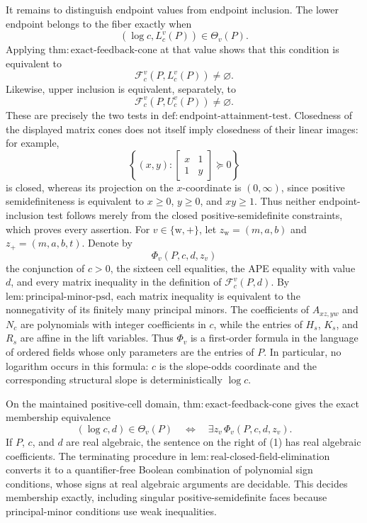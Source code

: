 It remains to distinguish endpoint values from endpoint inclusion.  The lower endpoint belongs to the fiber exactly when
\[
 (\log c,L_c^v(P))\in\Theta_v(P).
\]
Applying \(\mathrm{thm{:}exact\text{-}feedback\text{-}cone}\) at that value shows that this condition is equivalent to
\[
 \mathcal F_c^v(P,L_c^v(P))\ne\varnothing.
\]
Likewise, upper inclusion is equivalent, separately, to
\[
 \mathcal F_c^v(P,U_c^v(P))\ne\varnothing.
\]
These are precisely the two tests in \(\mathrm{def{:}endpoint\text{-}attainment\text{-}test}\).  Closedness of the displayed matrix cones does not itself imply closedness of their linear images: for example,
\[
 \left\{(x,y):
 \begin{bmatrix}x&1\\1&y\end{bmatrix}\succeq0\right\}
\]
is closed, whereas its projection on the \(x\)-coordinate is \((0,\infty)\), since positive semidefiniteness is equivalent to \(x\ge0\), \(y\ge0\), and \(xy\ge1\).  Thus neither endpoint-inclusion test follows merely from the closed positive-semidefinite constraints, which proves every assertion.
For \(v\in\{\mathrm w,+\}\), let \(z_{\mathrm w}=(m,a,b)\) and \(z_+=(m,a,b,t)\).  Denote by
\[
 \Phi_v(P,c,d,z_v)
\]
the conjunction of \(c>0\), the sixteen cell equalities, the APE equality with value \(d\), and every matrix inequality in the definition of \(\mathcal F_c^v(P,d)\).  By \(\mathrm{lem{:}principal\text{-}minor\text{-}psd}\), each matrix inequality is equivalent to the nonnegativity of its finitely many principal minors.  The coefficients of \(A_{xz,yw}\) and \(N_c\) are polynomials with integer coefficients in \(c\), while the entries of \(H_s\), \(K_s\), and \(R_s\) are affine in the lift variables.  Thus \(\Phi_v\) is a first-order formula in the language of ordered fields whose only parameters are the entries of \(P\).  In particular, no logarithm occurs in this formula: \(c\) is the slope-odds coordinate and the corresponding structural slope is deterministically \(\log c\).

On the maintained positive-cell domain, \(\mathrm{thm{:}exact\text{-}feedback\text{-}cone}\) gives the exact membership equivalence
\[
 (\log c,d)\in\Theta_v(P)
 \quad\Longleftrightarrow\quad
 \exists z_v\,\Phi_v(P,c,d,z_v). \tag{1}
\]
If \(P\), \(c\), and \(d\) are real algebraic, the sentence on the right of (1) has real algebraic coefficients.  The terminating procedure in \(\mathrm{lem{:}real\text{-}closed\text{-}field\text{-}elimination}\) converts it to a quantifier-free Boolean combination of polynomial sign conditions, whose signs at real algebraic arguments are decidable.  This decides membership exactly, including singular positive-semidefinite faces because principal-minor conditions use weak inequalities.

